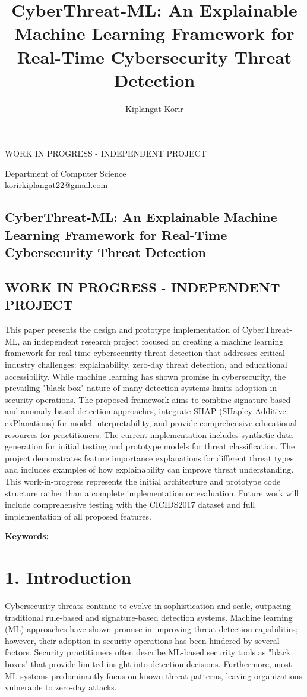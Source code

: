 \documentclass[12pt]{article}
\title{CyberThreat-ML: An Explainable Machine Learning Framework for Real-Time Cybersecurity Threat Detection}
\author{Kiplangat Korir}
\date{\vspace{-5ex}}
\begin{document}
\maketitle
{\color{red}\centering\Large WORK IN PROGRESS - INDEPENDENT PROJECT\\}

\begin{center}
Department of Computer Science\\
korirkiplangat22@gmail.com
\end{center}


\subsection{CyberThreat-ML: An Explainable Machine Learning Framework for Real-Time Cybersecurity Threat Detection}
\subsection{WORK IN PROGRESS - INDEPENDENT PROJECT}
This paper presents the design and prototype implementation of CyberThreat-ML, an independent research project focused on creating a machine learning framework for real-time cybersecurity threat detection that addresses critical industry challenges: explainability, zero-day threat detection, and educational accessibility. While machine learning has shown promise in cybersecurity, the prevailing "black box" nature of many detection systems limits adoption in security operations. The proposed framework aims to combine signature-based and anomaly-based detection approaches, integrate SHAP (SHapley Additive exPlanations) for model interpretability, and provide comprehensive educational resources for practitioners. The current implementation includes synthetic data generation for initial testing and prototype models for threat classification. The project demonstrates feature importance explanations for different threat types and includes examples of how explainability can improve threat understanding. This work-in-progress represents the initial architecture and prototype code structure rather than a complete implementation or evaluation. Future work will include comprehensive testing with the CICIDS2017 dataset and full implementation of all proposed features.

\noindent\textbf{Keywords:} 

\section{1. Introduction}
Cybersecurity threats continue to evolve in sophistication and scale, outpacing traditional rule-based and signature-based detection systems. Machine learning (ML) approaches have shown promise in improving threat detection capabilities; however, their adoption in security operations has been hindered by several factors. Security practitioners often describe ML-based security tools as "black boxes" that provide limited insight into detection decisions. Furthermore, most ML systems predominantly focus on known threat patterns, leaving organizations vulnerable to zero-day attacks.
\end{document}
